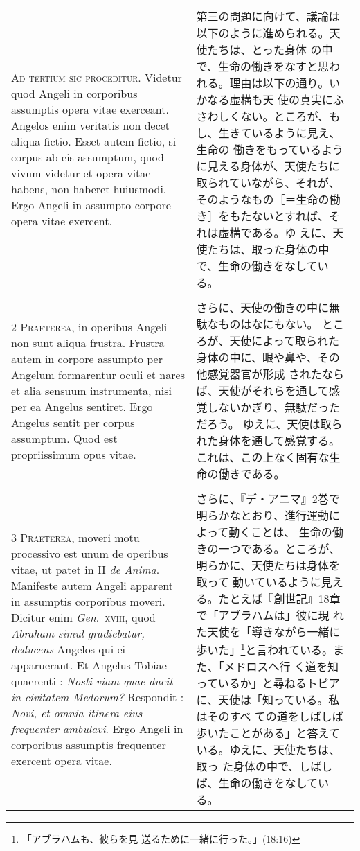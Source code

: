 \documentclass[10pt]{jsarticle} %
\begin{document}
\begin{longtable}{p{21em}p{21em}}


{\huge A}{\scshape d tertium sic proceditur}. Videtur quod
Angeli in corporibus assumptis opera vitae exerceant. Angelos enim
veritatis non decet aliqua fictio. Esset autem fictio, si corpus ab eis
assumptum, quod vivum videtur et opera vitae habens, non haberet
huiusmodi. Ergo Angeli in assumpto corpore opera vitae exercent.

&

第三の問題に向けて、議論は以下のように進められる。天使たちは、とった身体
 の中で、生命の働きをなすと思われる。理由は以下の通り。いかなる虚構も天
 使の真実にふさわしくない。ところが、もし、生きているように見え、生命の
 働きをもっているように見える身体が、天使たちに取られていながら、それが、
 そのようなもの［＝生命の働き］をもたないとすれば、それは虚構である。ゆ
 えに、天使たちは、取った身体の中で、生命の働きをなしている。

\\\\


{\scshape 2 Praeterea}, in operibus Angeli non sunt
aliqua frustra. Frustra autem in corpore assumpto per Angelum
formarentur oculi et nares et alia sensuum instrumenta, nisi per ea
Angelus sentiret. Ergo Angelus sentit per corpus assumptum. Quod est
propriissimum opus vitae.

&
さらに、天使の働きの中に無駄なものはなにもない。
ところが、天使によって取られた身体の中に、眼や鼻や、その他感覚器官が形成
 されたならば、天使がそれらを通して感覚しないかぎり、無駄だっただろう。
 ゆえに、天使は取られた身体を通して感覚する。これは、この上なく固有な生
 命の働きである。

\\\\


{\scshape 3 Praeterea}, moveri motu processivo est unum
de operibus vitae, ut patet in II {\itshape de Anima}. Manifeste autem Angeli
apparent in assumptis corporibus moveri. Dicitur enim {\itshape Gen}.~{\scshape xviii}, quod
{\itshape Abraham simul gradiebatur, deducens} Angelos qui ei apparuerant. Et
Angelus Tobiae quaerenti : {\itshape Nosti viam quae ducit in civitatem Medorum?}
Respondit : {\itshape Novi, et omnia itinera eius frequenter ambulavi}. Ergo Angeli
in corporibus assumptis frequenter exercent opera vitae.

&
さらに、『デ・アニマ』2巻で明らかなとおり、進行運動によって動くことは、
 生命の働きの一つである。ところが、明らかに、天使たちは身体を取って
 動いているように見える。たとえば『創世記』18章で「アブラハムは」彼に現
 れた天使を「導きながら一緒に歩いた」\footnote{「アブラハムも、彼らを見
 送るために一緒に行った。」(18:16)}と言われている。また、「メドロスへ行
 く道を知っているか」と尋ねるトビアに、天使は「知っている。私はそのすべ
 ての道をしばしば歩いたことがある」と答えている。ゆえに、天使たちは、取っ
 た身体の中で、しばしば、生命の働きをなしている。


\end{longtable}
\end{document}
